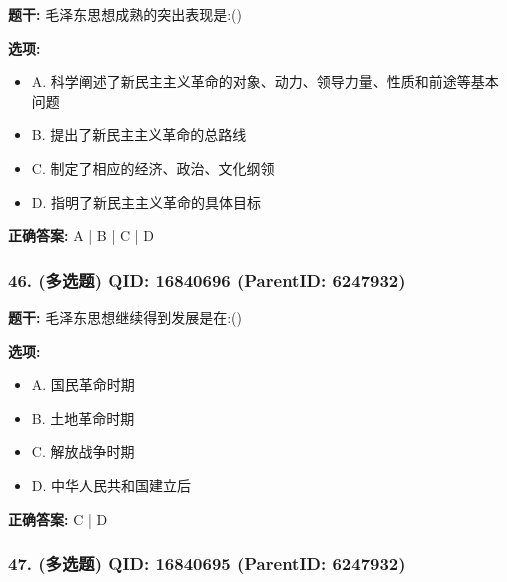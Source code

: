 \documentclass[12pt,UTF8]{ctexart}
\begin{document}
\textbf{题干:}
毛泽东思想成熟的突出表现是:()



\textbf{选项:}
\begin{itemize}[leftmargin=*]

  \item A. 科学阐述了新民主主义革命的对象、动力、领导力量、性质和前途等基本问题

  \item B. 提出了新民主主义革命的总路线

  \item C. 制定了相应的经济、政治、文化纲领

  \item D. 指明了新民主主义革命的具体目标

\end{itemize}

\textbf{正确答案:}
A | B | C | D

\vspace{0.3em}\hrulefill\vspace{0.7em}

\subsubsection*{46. (多选题) \small QID: 16840696 (ParentID: 6247932)}

\textbf{题干:}
毛泽东思想继续得到发展是在:()



\textbf{选项:}
\begin{itemize}[leftmargin=*]

  \item A. 国民革命时期

  \item B. 土地革命时期

  \item C. 解放战争时期

  \item D. 中华人民共和国建立后

\end{itemize}

\textbf{正确答案:}
C | D

\vspace{0.3em}\hrulefill\vspace{0.7em}

\subsubsection*{47. (多选题) \small QID: 16840695 (ParentID: 6247932)}
\end{document}
